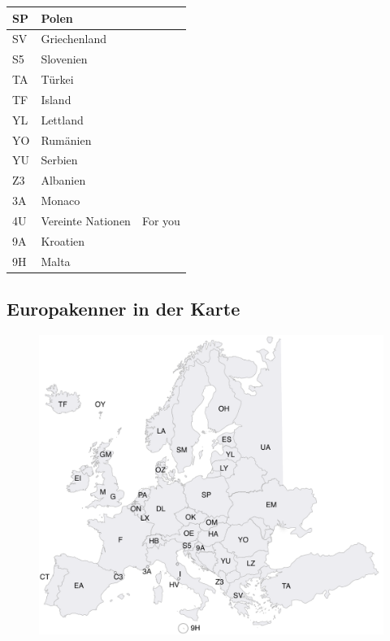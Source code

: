 \documentclass[11pt,BCOR=8.5mm]{scrartcl}
\begin{document}
\begin{longtable}{| l | l | l |}
  \hline
  SP & Polen & \\
  \hline
  SV & Griechenland & \\
  \hline
  S5 & Slovenien & \\
  \hline
  TA & Türkei & \\
  \hline
  TF & Island & \\
  \hline
  YL & Lettland & \\
  \hline
  YO & Rumänien & \\
  \hline
  YU & Serbien & \\
  \hline
  Z3 & Albanien & \\
  \hline
  3A & Monaco & \\
  \hline
  4U & Vereinte Nationen & For you \\
  \hline
  9A & Kroatien & \\
  \hline
  9H & Malta & \\
  \hline
\end{longtable}

\subsection{Europakenner in der Karte}\label{sub:europakarte}

\begin{figure}[htbp]
  \begin{center}
	\includegraphics[width=14cm]{figures/landeskenner-eu}
	\label{fig:landeskenner-eu}
  \end{center}
\end{figure}
\end{document}
